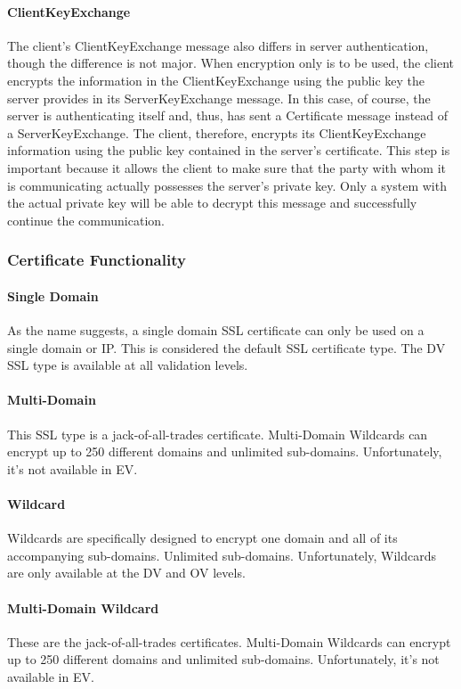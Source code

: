 \paragraph*{ClientKeyExchange}
The client’s ClientKeyExchange message also differs in server authentication, 
though the difference is not major. When encryption
only is to be used, the client encrypts the information in the ClientKeyExchange
 using the public key the server provides in its
ServerKeyExchange message. In this case, of course, the server is authenticating
 itself and, thus, has sent a Certificate message instead of
a ServerKeyExchange. The client, therefore, encrypts its ClientKeyExchange information 
using the public key contained in the
server’s certificate. This step is important because it allows the client
to make sure that the party with whom it is communicating actually
possesses the server’s private key. Only a system with the actual private key will 
be able to decrypt this message and successfully continue the communication.

\subsubsection*{Certificate Functionality}

\paragraph*{Single Domain}
As the name suggests, a single domain SSL certificate can only be used on a single 
domain or IP. This is considered the default SSL certificate type. The DV SSL type is
available at all validation levels.
\paragraph*{Multi-Domain}
This SSL type is a jack-of-all-trades certificate. Multi-Domain Wildcards can encrypt
 up to 250 different domains and unlimited sub-domains. Unfortunately, it's not available
  in EV.
\paragraph*{Wildcard}
Wildcards are specifically designed to encrypt one domain and all of its accompanying 
sub-domains. Unlimited sub-domains. Unfortunately, Wildcards are only available at the 
DV and OV levels.
\paragraph*{Multi-Domain Wildcard}
These are the jack-of-all-trades certificates. Multi-Domain Wildcards can encrypt up 
to 250 different domains and unlimited sub-domains. Unfortunately, it's not available 
in EV.

